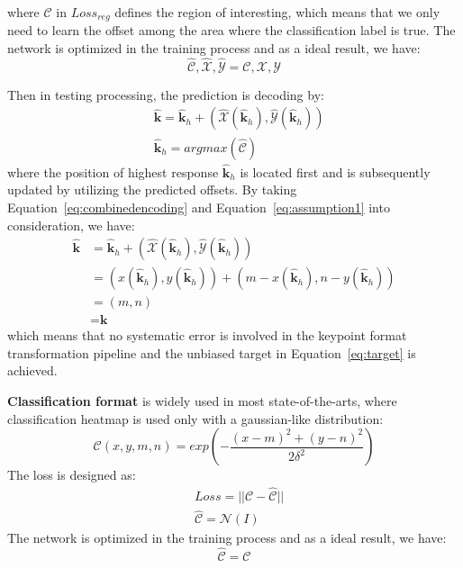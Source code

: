 \documentclass[10pt,journal,compsoc]{IEEEtran}
\begin{document}
where $\mathcal{C}$ in $Loss_{reg}$ defines the region of interesting, which means that we only need to learn the offset among the area where the classification label is true. The network is optimized in the training process and as a ideal result, we have:
\begin{equation}
\label{eq:assumption1}
    \hat{\mathcal{C}}, \hat{\mathcal{X}}, \hat{\mathcal{Y}} = \mathcal{C}, \mathcal{X}, \mathcal{Y}
\end{equation}

Then in testing processing, the prediction is decoding by:
\begin{equation}
    \begin{split}
    &\hat{\textbf{k}} = \hat{\textbf{k}}_{h} + (\hat{\mathcal{X}}(\hat{\textbf{k}}_{h}),\hat{\mathcal{Y}}(\hat{\textbf{k}}_{h}))\\
    &\hat{\textbf{k}}_{h} = argmax(\hat{\mathcal{C}})
    \end{split}
\end{equation}
where the position of highest response $\hat{\textbf{k}}_{h}$ is located first and is subsequently updated by utilizing the predicted offsets. By taking Equation~\ref{eq:combinedencoding} and Equation~\ref{eq:assumption1} into consideration, we have:
\begin{equation}
    \begin{split}
    \hat{\textbf{k}} &= \hat{\textbf{k}}_{h} + (\hat{\mathcal{X}}(\hat{\textbf{k}}_{h}),\hat{\mathcal{Y}}(\hat{\textbf{k}}_{h}))\\
                     &= (x(\hat{\textbf{k}}_{h}),y(\hat{\textbf{k}}_{h})) + (m-x(\hat{\textbf{k}}_{h}),n-y(\hat{\textbf{k}}_{h}))\\
                     &= (m,n)\\
                     &= \textbf{k}
    \end{split}
\end{equation}
which means that no systematic error is involved in the keypoint format transformation pipeline and the unbiased target in Equation~\ref{eq:target} is achieved.

\textbf{Classification format} is widely used in most state-of-the-arts, where classification heatmap is used only with a gaussian-like distribution:
\begin{equation}
\label{eq:encodinggaussian}
    \mathcal{C}(x,y,m,n)= exp(-\frac{(x-m)^2+(y-n)^2}{2\delta ^2})
\end{equation}
The loss is designed as:
\begin{equation}
    \begin{split}
    &Loss =  ||\mathcal{C}-\hat{\mathcal{C}}||\\
    &\hat{\mathcal{C}}= \mathcal{N}(I)
    \end{split}
\end{equation}
The network is optimized in the training process and as a ideal result, we have:
\begin{equation}
\label{eq:assumption2}
    \hat{\mathcal{C}} = \mathcal{C}
\end{equation}
\end{document}
